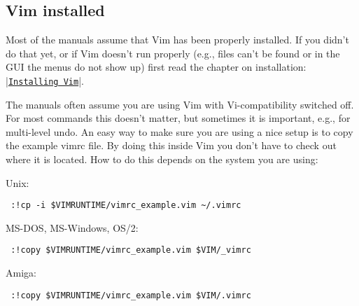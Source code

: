 % 
% 
% 
% 
% 

\subsection{Vim installed}
Most of the manuals assume that Vim has been properly installed.
If you didn't do that yet, or if Vim doesn't run properly (e.g., files can't be found or in the GUI the menus do not show up) first read the chapter on installation: |\hyperref[Installing Vim]{\texttt{Installing Vim}}|.

\label{not-compatible}
The manuals often assume you are using Vim with Vi-compatibility switched off.
For most commands this doesn't matter, but sometimes it is important, e.g., for multi-level undo.
An easy way to make sure you are using a nice setup is to copy the example vimrc file.
By doing this inside Vim you don't have to check out where it is located.
How to do this depends on the system you are using:

Unix:
\begin{verbatim}
 :!cp -i $VIMRUNTIME/vimrc_example.vim ~/.vimrc
\end{verbatim}
MS-DOS, MS-Windows, OS/2:
\begin{verbatim}
 :!copy $VIMRUNTIME/vimrc_example.vim $VIM/_vimrc
\end{verbatim}
Amiga:
\begin{verbatim}
 :!copy $VIMRUNTIME/vimrc_example.vim $VIM/.vimrc
\end{verbatim}

